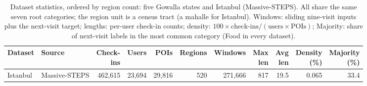 \begin{table}[htbp]
\caption{Dataset statistics, ordered by region count: five Gowalla states and Istanbul
(Massive-STEPS). All share the same seven root categories; the region unit is a census
tract (a mahalle for Istanbul). Windows: sliding nine-visit inputs plus the next-visit
target; lengths: per-user check-in counts; density: $100\times\text{check-ins}/(\text{users}\times\text{POIs})$; Majority: share of next-visit
labels in the most common category (Food in every dataset).}
\label{tab:mobiwac:datasets}
\centering
\setlength{\tabcolsep}{3pt}
\begin{adjustbox}{max width=\textwidth}
\begin{tabular}{l l r r r r r r r r r}
\toprule
\textbf{Dataset} & \textbf{Source} & \shortstack[r]{\textbf{Check-}\\\textbf{ins}} & \textbf{Users} & \textbf{POIs} &
\textbf{Regions} & \textbf{Windows} & \shortstack[r]{\textbf{Max}\\\textbf{len}} & \shortstack[r]{\textbf{Avg}\\\textbf{len}} & \shortstack[r]{\textbf{Density}\\\textbf{(\%)}} & \shortstack[r]{\textbf{Majority}\\\textbf{(\%)}} \\
\midrule
Istanbul & Massive-STEPS &   462{,}615 & 23{,}694 &  29{,}816 &     520 &   271{,}666 &     817 &  19.5 & 0.065 & 33.4 \\

\end{tabular}
\end{adjustbox}
\end{table}
